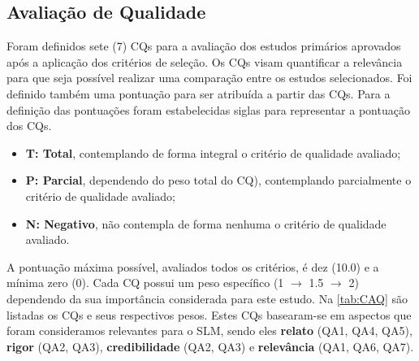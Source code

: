     \subsection{Avaliação de Qualidade} \label{scec:AvalQualidade}
    
Foram definidos sete (7) \acp{CQ} para a avaliação dos estudos primários aprovados após a aplicação dos critérios de seleção. 
Os \acp{CQ} visam quantificar a relevância para que seja possível realizar uma comparação entre os estudos selecionados. 
Foi definido também uma pontuação para ser atribuída a partir das \acp{CQ}. 
Para a definição das pontuações foram estabelecidas siglas para representar a pontuação dos \acp{CQ}. 

\begin{itemize}
    \item \textbf{T: Total}, contemplando de forma integral o critério de qualidade avaliado;
    \item \textbf{P: Parcial}, dependendo do peso total do \ac{CQ}), contemplando parcialmente o critério de qualidade avaliado;
    \item \textbf{N: Negativo}, não contempla de forma nenhuma o critério de qualidade avaliado.
\end{itemize}

A pontuação máxima possível, avaliados todos os critérios, é dez (10.0) e a mínima zero (0). 
Cada \ac{CQ} possui um peso específico (1 $\rightarrow$ 1.5 $\rightarrow$ 2) dependendo da sua importância considerada para este estudo. 
Na \autoref{tab:CAQ} são listadas os \acp{CQ} e seus respectivos pesos. 
Estes \acp{CQ} basearam-se em aspectos que foram consideramos relevantes para o \ac{SLM}, sendo eles \textbf{relato} (QA1, QA4, QA5), \textbf{rigor} (QA2, QA3), \textbf{credibilidade} (QA2, QA3) e \textbf{relevância} (QA1, QA6, QA7).
    
